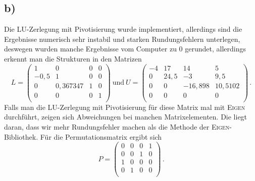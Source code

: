 \subsection{b)}
Die LU-Zerlegung mit Pivotisierung wurde implementiert, allerdings sind die Ergebnisse
numerisch sehr instabil und starken Rundungsfehlern unterlegen,
deswegen wurden manche Ergebnisse vom Computer zu 0 gerundet,
allerdings erkennt man die Strukturen in den Matrizen
\begin{equation}
  L =
  \begin{pmatrix}
    1 & 0 & 0 & 0 \\
    -0,5 & 1 & 0 & 0 \\
    0 & 0,367347 & 1 & 0 \\
    0 & 0 & 0 & 1 \\
  \end{pmatrix}
  \ \text{und} \ U =
  \begin{pmatrix}
    -4 & 17 & 14 & 5 \\
    0 & 24,5 & -3 & 9,5 \\
    0 & 0 & -16,898 & 10,5102 \\
    0 & 0 & 0 & 0 \\
  \end{pmatrix} \, .
\end{equation}
Falls man die LU-Zerlegung mit Pivotisierung für diese Matrix mal mit \textsc{Eigen}
durchführt, zeigen sich Abweichungen bei manchen Matrixelementen. Die liegt daran,
dass wir mehr Rundungsfehler machen als die Methode der \textsc{Eigen}-Bibliothek.
Für die Permutationsmatrix ergibt sich
\begin{equation}
  P =
  \begin{pmatrix}
    0 & 0 & 0 & 1 \\
    0 & 0 & 1 & 0 \\
    1 & 0 & 0 & 0 \\
    0 & 1 & 0 & 0 \\
  \end{pmatrix} \, .
\end{equation}

